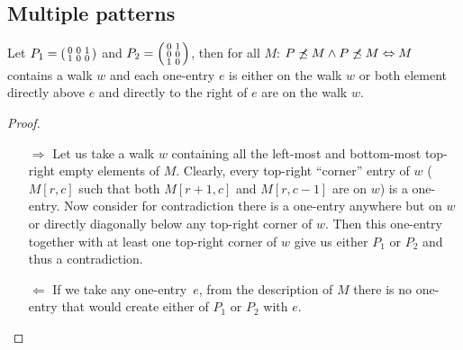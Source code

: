 \subsection{Multiple patterns}
\begin{thm}
Let $P_1=\left(\begin{smallmatrix}0&0&1\\1&0&0\end{smallmatrix}\right)$ and $P_2=\left(\begin{smallmatrix}0&1\\0&0\\1&0\end{smallmatrix}\right)$, then for all $M$: $P\not\preceq M\wedge P\not\preceq M\Leftrightarrow M$ contains a walk $w$ and each one-entry $e$ is either on the walk $w$ or both element directly above $e$ and directly to the right of $e$ are on the walk $w$.
\begin{proof}
\begin{itemize}
\item[$\Rightarrow$] Let us take a walk $w$ containing all the left-most and bottom-most top-right empty elements of $M$. Clearly, every top-right ``corner'' entry of $w$ ($M[r,c]$ such that both $M[r+1,c]$ and $M[r,c-1]$ are on $w$) is a one-entry. Now consider for contradiction there is a one-entry anywhere but on $w$ or directly diagonally below any top-right corner of $w$. Then this one-entry together with at least one top-right corner of $w$ give us either $P_1$ or $P_2$ and thus a contradiction.
\item[$\Leftarrow$] If we take any one-entry~$e$, from the description of $M$ there is no one-entry that would create either of $P_1$ or $P_2$ with $e$.
\end{itemize}
\end{proof}
\end{thm}